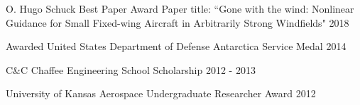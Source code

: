 
\begin{cvhonors}

  \cvawardentry
    {O. Hugo Schuck Best Paper Award \quad{}} %
    {Paper title: ``Gone with the wind: Nonlinear Guidance for Small Fixed-wing Aircraft in Arbitrarily Strong Windfields"} %
    {2018} %

  \cvawardentry
    {Awarded United States Department of Defense Antarctica Service Medal} %
    {} %
    {2014} %

\vspace*{-9pt}

%
  \cvawardentry
    {C\&C Chaffee Engineering School Scholarship} %
    {} %
    {2012 - 2013} %

\vspace*{-9pt}

  \cvawardentry
    {University of Kansas Aerospace Undergraduate Researcher Award} %
    {} %
    {2012} %

\end{cvhonors}
